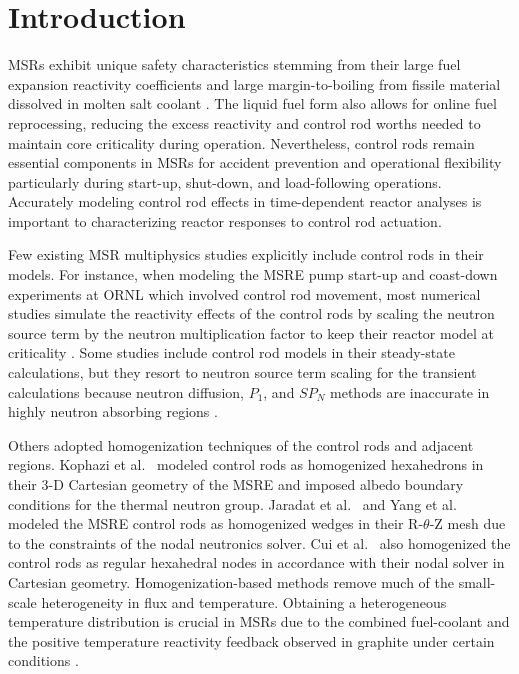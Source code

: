 \section{Introduction}

\glspl{MSR} exhibit unique safety characteristics stemming from their large fuel expansion
reactivity coefficients and large margin-to-boiling from fissile material dissolved in molten salt
coolant \cite{dolan_1_2017}. The liquid fuel form also allows for online fuel reprocessing,
reducing the excess reactivity and control rod worths needed to maintain core criticality during
operation. Nevertheless, control rods remain essential components in \glspl{MSR} for accident
prevention and operational flexibility particularly during start-up, shut-down, and load-following
operations. Accurately modeling control rod effects in time-dependent reactor
analyses is important to characterizing reactor responses to control rod actuation.

Few existing \gls{MSR} multiphysics studies explicitly include control rods in their models. For
instance, when modeling the \gls{MSRE} pump start-up and coast-down experiments at \gls{ORNL} which
involved control rod movement, most numerical studies simulate the reactivity effects of the
control rods by scaling the neutron source term by the neutron multiplication factor to keep their
reactor model at criticality \cite{delpech_benchmark_2003, krepel_dyn3d-msr_2007}.
Some studies include control rod models in their steady-state calculations, but they resort to
neutron source term scaling for the transient calculations because neutron diffusion, $P_1$, and
$SP_N$ methods are inaccurate in highly neutron absorbing regions
\cite{kophazi_development_2009, jaradat_development_2021, yang_development_2022}.

Others adopted homogenization techniques of the control rods and adjacent regions.
Kophazi et al.\ \cite{kophazi_development_2009} modeled
control rods as homogenized hexahedrons in their 3-D Cartesian geometry of the \gls{MSRE}
and imposed albedo boundary conditions for the thermal neutron group. Jaradat et al.\
\cite{jaradat_development_2021} and Yang et al.\ \cite{yang_development_2022} modeled the
\gls{MSRE} control rods as homogenized wedges in their R-$\theta$-Z mesh due to the constraints of
the nodal neutronics solver. Cui et al.\ \cite{cui_development_2021} also homogenized the control
rods as regular hexahedral nodes in accordance with their nodal solver in Cartesian geometry.
Homogenization-based methods remove much of the small-scale heterogeneity in flux and temperature.
Obtaining a heterogeneous temperature distribution is
crucial in \glspl{MSR} due to the combined fuel-coolant and the positive temperature
reactivity feedback observed in graphite under certain conditions \cite{mathieu_thorium_2006}.

